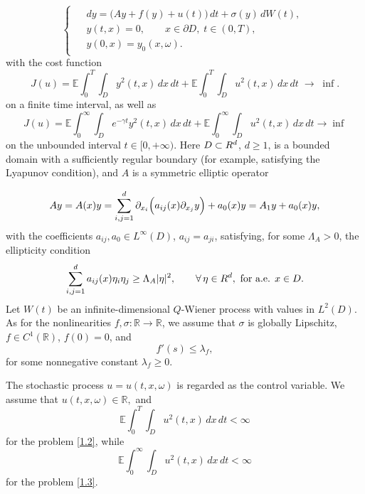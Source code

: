 \documentclass[a4paper,12pt]{article}
\numberwithin{equation}{section}
\newcommand{\R}{{\mathbb R}}
\def\R{\mathbb{R}}
\def\E{\mathbb{E}}
\begin{document}
\begin{equation}\label{1.1}
\begin{cases}
\begin{aligned}
& dy = \bigl(Ay + f(y) + u(t)\bigr)\,dt
      + \sigma(y)\,dW(t), \\
& y(t,x) = 0,
\qquad x\in \partial D,\; t\in(0,T), \\
& y(0,x) = y_0(x,\omega).
\end{aligned}
\end{cases}
\end{equation}
with the cost function
\begin{equation}\label{1.2}
J(u)
=
\E\int_{0}^{T}\int_{D} y^2(t,x)\,dx\,dt
+
\E\int_{0}^{T}\int_{D} u^2(t,x)\,dx\,dt
\;\to\;
\inf .
\end{equation}
on a finite time interval, as well as
\begin{equation}\label{1.3}
J(u)
=
\E\int_{0}^{\infty}\int_{D} e^{-\gamma t} y^2(t,x)\,dx\,dt
+
\E\int_{0}^{\infty}\int_{D} u^2(t,x)\,dx\,dt
\to \inf 
\end{equation}
on the unbounded interval $t \in [0,+\infty)$. 
Here $D\subset \mathbb \R^d$, $d\ge 1$, is a bounded domain with a
sufficiently regular boundary (for example, satisfying the Lyapunov
condition), and $A$ is a symmetric elliptic operator

\[
Ay=A(x)y
=
\sum_{i,j=1}^{d}
\partial_{x_i}
\Bigl(
a_{ij}(x)\partial_{x_j}y
\Bigr)
+
a_0(x)y
=
A_1y+a_0(x)y,
\]
with the coefficients
$a_{ij},a_0\in L^\infty(D)$,
$a_{ij}=a_{ji}$,
satisfying, for some $\Lambda_A>0$, the ellipticity condition
\begin{equation}\label{1.4}
\sum_{i,j=1}^{d}
a_{ij}(x)\eta_i\eta_j
\ge
\Lambda_A |\eta|^2,
\qquad
\forall\,\eta\in\mathbb \R^d,
\ \text{for a.e. } x\in D.
\end{equation}
Let
$W(t)$ be an infinite-dimensional $Q$-Wiener process with values in
$L^2(D)$.
As for the nonlinearities $f,\sigma:\mathbb R\to\mathbb R$, we assume that $\sigma$ is globally Lipschitz,
$f\in C^1(\mathbb R)$,
$f(0)=0$, and
\begin{equation}\label{1.5}
f'(s)\le \lambda_f,
\end{equation}
for some nonnegative constant $\lambda_f \geq 0$.

The stochastic process
$u=u(t,x,\omega)$
is regarded as the control variable.
We assume that
$
u(t,x,\omega)\in \mathbb R,
$
and
\[
\E\int_0^T\int_D u^2(t,x)\,dx\,dt < \infty
\]
for the problem \eqref{1.2}, while
\[
\E\int_0^\infty\int_D u^2(t,x)\,dx\,dt < \infty
\]
for the problem \eqref{1.3}.
\end{document}
